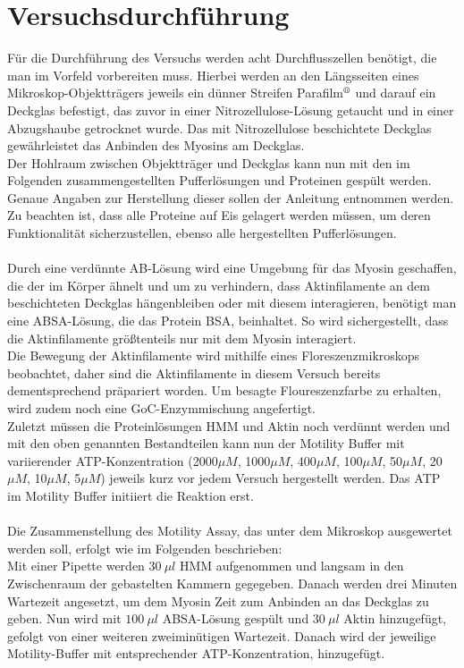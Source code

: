 \section{Versuchsdurchführung}
Für die Durchführung des Versuchs werden acht Durchflusszellen benötigt, die man im Vorfeld vorbereiten muss. Hierbei werden an den Längsseiten eines Mikroskop-Objektträgers jeweils ein dünner Streifen Parafilm$\textsuperscript{\textregistered}$ und darauf ein Deckglas befestigt, das zuvor in einer Nitrozellulose-Lösung getaucht und in einer Abzugshaube getrocknet wurde. Das mit Nitrozellulose beschichtete Deckglas gewährleistet das Anbinden des Myosins am Deckglas.\\
Der Hohlraum zwischen Objektträger und Deckglas kann nun mit den im Folgenden zusammengestellten Pufferlösungen und Proteinen gespült werden. Genaue Angaben zur Herstellung dieser sollen der Anleitung entnommen werden.\\
Zu beachten ist, dass alle Proteine auf Eis gelagert werden müssen, um deren Funktionalität sicherzustellen, ebenso alle hergestellten Pufferlösungen.\\
\\
Durch eine verdünnte AB-Lösung wird eine Umgebung für das Myosin geschaffen, die der im Körper ähnelt und um zu verhindern, dass Aktinfilamente an dem beschichteten Deckglas hängenbleiben oder mit diesem interagieren, benötigt man eine ABSA-Lösung, die das Protein BSA, beinhaltet. So wird sichergestellt, dass die Aktinfilamente größtenteils nur mit dem Myosin interagiert.\\
Die Bewegung der Aktinfilamente wird mithilfe eines Floreszenzmikroskops beobachtet, daher sind die Aktinfilamente in diesem Versuch bereits dementsprechend präpariert worden. Um besagte Floureszenzfarbe zu erhalten, wird zudem noch eine GoC-Enzymmischung angefertigt.\\
Zuletzt müssen die Proteinlösungen HMM und Aktin noch verdünnt werden und mit den oben genannten Bestandteilen kann nun der Motility Buffer mit variierender ATP-Konzentration (2000$ \mu M$, 1000$ \mu M$, 400$ \mu M$, 100$ \mu M$, 50$ \mu M$, 20$ \mu M$, 10$ \mu M$, 5$ \mu M$) jeweils kurz vor jedem Versuch hergestellt werden. Das ATP im Motility Buffer initiiert die Reaktion erst.\\
\\
Die Zusammenstellung des Motility Assay, das unter dem Mikroskop ausgewertet werden soll, erfolgt wie im Folgenden beschrieben:\\
Mit einer Pipette werden $30~ \mu l$ HMM aufgenommen und langsam in den Zwischenraum der gebastelten Kammern gegegeben. Danach werden drei Minuten Wartezeit angesetzt, um dem Myosin Zeit zum Anbinden an das Deckglas zu geben. Nun wird mit $100~ \mu l$ ABSA-Lösung gespült und $30~ \mu l$ Aktin hinzugefügt, gefolgt von einer weiteren zweiminütigen Wartezeit. Danach wird der jeweilige Motility-Buffer mit entsprechender ATP-Konzentration, hinzugefügt.\\
